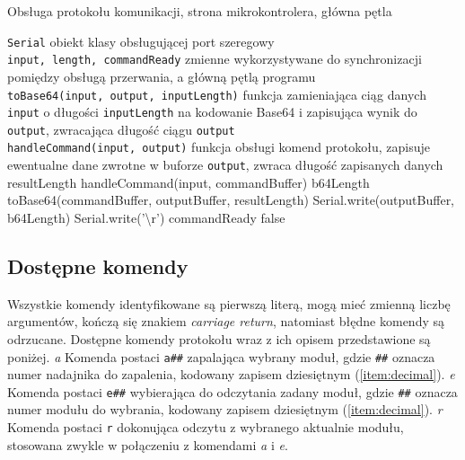 \begin{algorithm}
\caption{Obsługa protokołu komunikacji, strona mikrokontrolera, główna pętla}
\label{alg:proto_uc_main}
\begin{algorithmic}[1]
  \REQUIRE \texttt{Serial} \ppauza obiekt klasy obsługującej port szeregowy\\
  \texttt{input, length, commandReady} \ppauza zmienne wykorzystywane do synchronizacji pomiędzy obsługą przerwania, a główną pętlą programu\\
  \texttt{toBase64(input, output, inputLength)} \ppauza funkcja zamieniająca ciąg danych \texttt{input} o długości \texttt{inputLength} na kodowanie Base64 i zapisująca wynik do \texttt{output}, zwracająca długość ciągu \texttt{output}\\
  \texttt{handleCommand(input, output)} \ppauza funkcja obsługi komend protokołu, zapisuje ewentualne dane zwrotne w buforze \texttt{output}, zwraca długość zapisanych danych
      \STATE resultLength \textleftarrow{} handleCommand(input, commandBuffer)
      \STATE b64Length \textleftarrow{} toBase64(commandBuffer, outputBuffer, resultLength)
      \STATE Serial.write(outputBuffer, b64Length)
      \STATE Serial.write('\textbackslash{}r')
      \STATE commandReady \textleftarrow{} false
    \ENDIF
  \ENDWHILE
\end{algorithmic}
\end{algorithm}

\subsection{Dostępne komendy}\label{sec:commands}

Wszystkie komendy identyfikowane są pierwszą literą, mogą mieć zmienną liczbę argumentów, kończą się znakiem \textit{carriage return}, natomiast błęd\-ne komendy są odrzucane.
Dostępne komendy protokołu wraz z ich opisem przedstawione są poniżej.
\newline
\newline
\textsl{a}
Komenda postaci \texttt{a\#\#} zapalająca wybrany moduł, gdzie \texttt{\#\#} oznacza numer nadajnika do zapalenia, kodowany zapisem dziesiętnym (\ref{item:decimal}).
\newline
\newline
\textsl{e}
Komenda postaci \texttt{e\#\#} wybierająca do odczytania zadany moduł, gdzie \texttt{\#\#} oznacza numer modułu do wybrania, kodowany zapisem dziesiętnym (\ref{item:decimal}).
\newline
\newline
\textsl{r}
Komenda postaci \texttt{r} dokonująca odczytu z wybranego aktualnie modułu, stosowana zwykle w połączeniu z komendami \textsl{a} i \textsl{e}.

